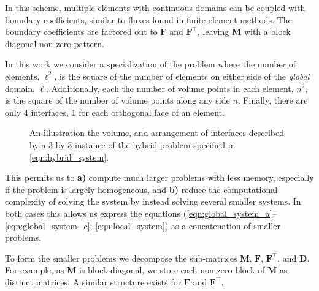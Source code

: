 \noindent
In this scheme, multiple elements with continuous domains can be coupled 
with boundary coefficients, similar to fluxes found in finite element 
methods. The boundary coefficients are factored out to $\textbf{F}$ and 
$\textbf{F}^{\intercal}$, leaving $\textbf{M}$ with a block diagonal 
non-zero pattern. 

\begin{aside}
	In this work we consider a specialization of the problem where the 
	number of elements, $\ell^2$, is the square of the number of elements
	on either side of the \emph{global} domain, $\ell$. Additionally, 
	each the number of volume points in each element, $n^2$, is the 
	square of the number of volume points along any side $n$. Finally, 
	there are only 4 interfaces, 1 for each orthogonal face of an element.
\end{aside}

\begin{figure}
	\centering
	
	\caption{An illustration the volume, and arrangement of interfaces 
		described by a 3-by-3 instance of the hybrid problem specified 
		in \eqref{eqn:hybrid_system}.}
	\label{fig:volume_diagram}
\end{figure}

\noindent
This permits us to \textbf{a)} compute much larger problems with less 
memory, especially if the problem is largely homogeneous, and \textbf{b)} 
reduce the computational complexity of solving the system by instead 
solving several smaller systems. In both cases this allows us express the 
equations (\ref{eqn:global_system_a}--\ref{eqn:global_system_c}, 
\ref{eqn:local_system}) as a concatenation of smaller problems. 

To form the smaller problems we decompose the sub-matrices 
$\textbf{M}$, $\textbf{F}$, $\textbf{F}^{\intercal}$, and $\textbf{D}$. 
For example, as $\textbf{M}$ is block-diagonal, we store each non-zero 
block of $\textbf{M}$ as distinct matrices. A similar structure exists 
for $\textbf{F}$ and $\textbf{F}^{\intercal}$. 

